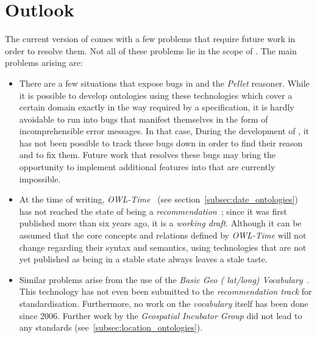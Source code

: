 \vspace{1em}


\section{Outlook}

The current version of \smarthomeweather comes with a few problems that require future work in order to resolve them. Not all of these problems lie in the scope of \smarthomeweather. The main problems arising are:

\begin{itemize}
  \item There are a few situations that expose bugs in \protege and the \emph{Pellet} reasoner. While it is possible to develop ontologies using these technologies which cover a certain domain exactly in the way required by a specification, it is hardly avoidable to run into bugs that manifest themselves in the form of incomprehensible error messages. In that case, During the development of \smarthomeweather, it has not been possible to track these bugs down in order to find their reason and to fix them. Future work that resolves these bugs may bring the opportunity to implement additional features into \smarthomeweather that are currently impossible.
  
  \item At the time of writing, \emph{OWL-Time}~\cite{owl-time} (see section~\ref{subsec:date_ontologies}) has not reached the state of being a \emph{ recommendation}~\cite{w3c-process}; since it was first published more than six years ago, it is a \emph{working draft}. Although it can be assumed that the core concepts and relations defined by \emph{OWL-Time} will not change regarding their syntax and semantics, using technologies that are not yet published as being in a stable state always leaves a stale taste.
  
  \item Similar problems arise from the use of the \emph{Basic Geo ( lat/long) Vocabulary}~\cite{wgs84_vocabulary}. This technology has not even been submitted to the \emph{ recommendation track} for standardisation. Furthermore, no work on the \emph{ vocabulary} itself has been done since 2006. Further work by the \emph{ Geospatial Incubator Group} did not lead to any standards (see~\ref{subsec:location_ontologies}).
\end{itemize}

